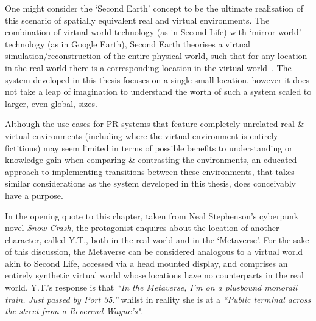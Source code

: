 One might consider the `Second Earth' concept to be the ultimate realisation of this scenario of spatially equivalent real and virtual environments. The combination of virtual world technology (as in Second Life) with `mirror world' technology (as in Google Earth), Second Earth theorises a virtual simulation/reconstruction of the entire physical world, such that for any location in the real world there is a corresponding location in the virtual world~\cite{Roush2007}. The system developed in this thesis focuses on a single small location, however it does not take a leap of imagination to understand the worth of such a system scaled to larger, even global, sizes.

Although the use cases for PR systems that feature completely unrelated real \& virtual environments (including where the virtual environment is entirely fictitious) may seem limited in terms of possible benefits to understanding or knowledge gain when comparing \& contrasting the environments, an educated approach to implementing transitions between these environments, that takes similar considerations as the system developed in this thesis, does conceivably have a purpose.

In the opening quote to this chapter, taken from Neal Stephenson's cyberpunk novel \textit{Snow Crash}, the protagonist enquires about the location of another character, called Y.T., both in the real world and in the `Metaverse'. For the sake of this discussion, the Metaverse can be considered analogous to a virtual world akin to Second Life, accessed via a head mounted display, and comprises an entirely synthetic virtual world whose locations have no counterparts in the real world. Y.T.'s response is that \textit{``In  the Metaverse, I'm on a plusbound monorail train. Just passed by Port 35.''} whilst in reality she is at a \textit{``Public terminal across the street from a Reverend Wayne's"}.


